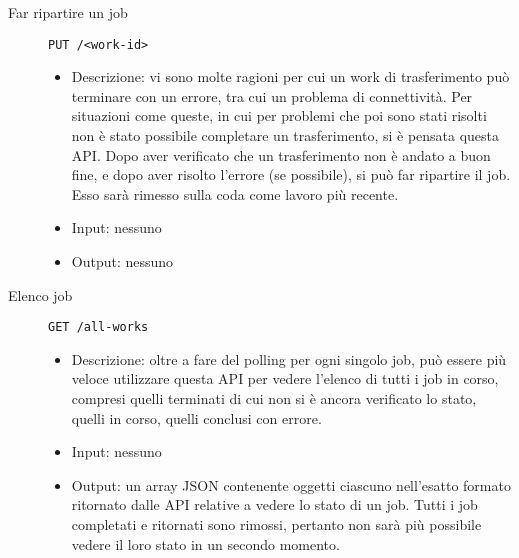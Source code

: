 \begin{description}
    \item[Far ripartire un job]\texttt{PUT /<work-id>}
    \begin{itemize}
        \item Descrizione: vi sono molte ragioni per cui un work di trasferimento può
        terminare con un errore, tra cui un problema di connettività. Per situazioni
        come queste, in cui per problemi che poi sono stati risolti non è stato
        possibile completare un trasferimento, si è pensata questa API.
        Dopo aver verificato che un trasferimento non è andato a buon fine, e dopo
        aver risolto l'errore (se possibile), si può far ripartire il job. Esso
        sarà rimesso sulla coda come lavoro più recente.
        \item Input: nessuno
        \item Output: nessuno
    \end{itemize}

    \item[Elenco job]\texttt{GET /all-works}
    \begin{itemize}
        \item Descrizione: oltre a fare del polling per ogni singolo job, può essere
        più veloce utilizzare questa API per vedere l'elenco di tutti i job in corso,
        compresi quelli terminati di cui non si è ancora verificato lo stato,
        quelli in corso, quelli conclusi con errore.
        \item Input: nessuno
        \item Output: un array JSON contenente oggetti ciascuno nell'esatto
        formato ritornato dalle API relative a vedere lo stato di un job.
        Tutti i job completati e ritornati sono rimossi, pertanto non sarà
        più possibile vedere il loro stato in un secondo momento.
    \end{itemize}
\end{description}